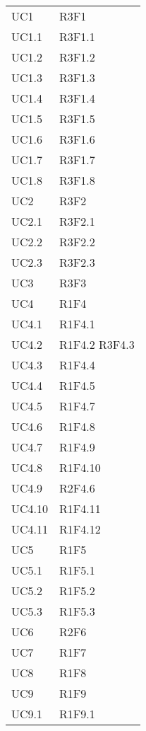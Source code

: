 \begin{longtable} {
		>{\centering}p{28mm}  
		>{}p{20mm}
		}
		UC1 & R3F1 \TBstrut \\ [2mm]
		UC1.1 & R3F1.1 \TBstrut \\ [2mm]
		UC1.2 & R3F1.2 \TBstrut \\ [2mm]
		UC1.3 & R3F1.3 \TBstrut \\ [2mm]
		UC1.4 & R3F1.4 \TBstrut \\ [2mm]
		UC1.5 & R3F1.5 \TBstrut \\ [2mm]
		UC1.6 & R3F1.6 \TBstrut \\ [2mm]
		UC1.7 & R3F1.7 \TBstrut \\ [2mm]
		UC1.8 & R3F1.8 \TBstrut \\ [2mm]
		UC2 & R3F2 \TBstrut \\ [2mm]
		UC2.1 & R3F2.1 \TBstrut \\ [2mm]
		UC2.2 & R3F2.2 \TBstrut \\ [2mm]
		UC2.3 & R3F2.3 \TBstrut \\ [2mm]
		UC3 & R3F3 \TBstrut \\ [2mm]
		UC4 & R1F4 \TBstrut \\ [2mm]
		UC4.1 & R1F4.1 \TBstrut \\ [2mm]
		UC4.2 & R1F4.2 R3F4.3 \TBstrut \\ [2mm]
		UC4.3 & R1F4.4 \TBstrut \\ [2mm]
		UC4.4 & R1F4.5 \TBstrut \\ [2mm]
		UC4.5 & R1F4.7 \TBstrut \\ [2mm]
		UC4.6 & R1F4.8 \TBstrut \\ [2mm]
		UC4.7 & R1F4.9 \TBstrut \\ [2mm]
		UC4.8 & R1F4.10 \TBstrut \\ [2mm]
		UC4.9 & R2F4.6 \TBstrut \\ [2mm]
		UC4.10 & R1F4.11 \TBstrut \\ [2mm]
		UC4.11 & R1F4.12 \TBstrut \\ [2mm]
		UC5 & R1F5 \TBstrut \\ [2mm]
		UC5.1 & R1F5.1 \TBstrut \\ [2mm]
		UC5.2 & R1F5.2 \TBstrut \\ [2mm]
		UC5.3 & R1F5.3 \TBstrut \\ [2mm]
		UC6 & R2F6 \TBstrut \\ [2mm]
		UC7 & R1F7 \TBstrut \\ [2mm]
		UC8 & R1F8 \TBstrut \\ [2mm]
		UC9 & R1F9 \TBstrut \\ [2mm]
		UC9.1 & R1F9.1 \TBstrut \\ [2mm]

\end{longtable}
